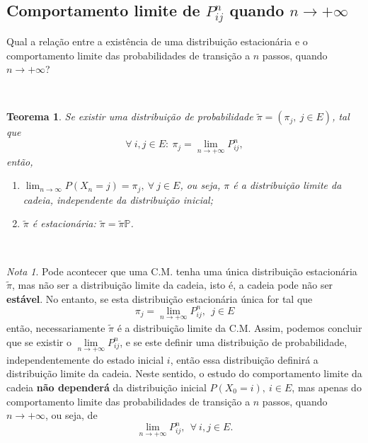 \documentclass[
  11pt,
  a4paper,
]{book}
\newtheorem{theorem}{Teorema}[chapter]
\theoremstyle{definition}
\theoremstyle{definition}
\theoremstyle{definition}
\theoremstyle{definition}
\theoremstyle{remark}
\newtheorem*{remark}{Nota }
\begin{document}
\subsection{\texorpdfstring{Comportamento limite de \(P_{ij}^n\) quando \(n\to+\infty\)}{Comportamento limite de P\_\{ij\}\^{}n quando n\textbackslash to+\textbackslash infty}}\label{comportamento-limite-de-p_ijn-quando-ntoinfty}

Qual a relação entre a existência de uma distribuição estacionária e o comportamento limite das probabilidades de transição a \(n\) passos, quando \(n \to +\infty\)?

\(\,\)

\begin{theorem}

Se existir uma distribuição de probabilidade \(\tilde{\pi}=(\pi_j, ~j \in E)\), tal que
\[\forall ~i,j \in E: ~ \pi_j=\lim\limits_{n \to +\infty} P_{ij}^n,\]
então,

\begin{enumerate}
\def\labelenumi{(\roman{enumi})}
\item
  \(\displaystyle \lim_{n\to\infty} P(X_n=j) = \pi_j, ~\forall ~ j \in E\), ou seja, \(\pi\) é a distribuição limite da cadeia, independente da distribuição inicial;
\item
  \(\tilde\pi\) é estacionária: \(\tilde\pi = \tilde\pi \mathbb{P}\).
\end{enumerate}

\end{theorem}

\(\,\)

\begin{remark}
Pode acontecer que uma C.M. tenha uma única distribuição estacionária \(\tilde{\pi}\), mas não ser a distribuição limite da cadeia, isto é, a cadeia pode não ser \textbf{estável}. No entanto, se esta distribuição estacionária única for tal que
\[\pi_j=\lim\limits_{n \to +\infty} P_{ij}^n, ~~j \in E\]
então, necessariamente \(\tilde{\pi}\) é a distribuição limite da C.M. Assim, podemos concluir que se existir o \(\lim\limits_{n \to +\infty} P_{ij}^n\), e se este definir uma distribuição de probabilidade, independentemente do estado inicial \(i\), então essa distribuição definirá a distribuição limite da cadeia. Neste sentido, o estudo do comportamento limite da cadeia \textbf{não dependerá} da distribuição inicial \(P(X_0=i), ~i \in E\), mas apenas do comportamento limite das probabilidades de transição a \(n\) passos, quando \(n \to +\infty\), ou seja, de
\[\lim\limits_{n \to +\infty} P_{ij}^n, ~~ \forall ~ i,j \in E.\]
\end{remark}
\end{document}
